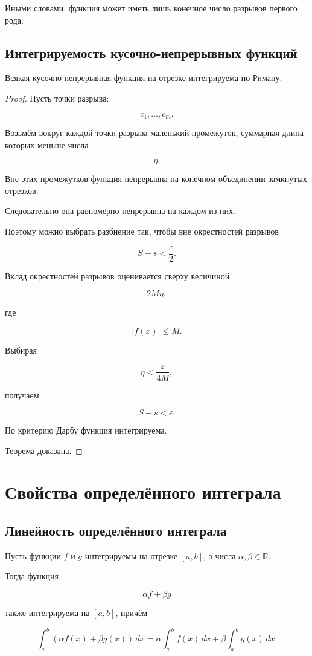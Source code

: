 \documentclass[14pt]{extreport}
\begin{document}
Иными словами, функция может иметь лишь конечное число разрывов первого рода.

\section{Интегрируемость кусочно-непрерывных функций}

\begin{theorem}
Всякая кусочно-непрерывная функция на отрезке
интегрируема по Риману.
\end{theorem}

\begin{proof}

Пусть точки разрыва:

\[
c_1,\ldots,c_m.
\]

Возьмём вокруг каждой точки разрыва маленький промежуток,
суммарная длина которых меньше числа

\[
\eta.
\]

Вне этих промежутков функция непрерывна на конечном объединении
замкнутых отрезков.

Следовательно она равномерно непрерывна на каждом из них.

Поэтому можно выбрать разбиение так, чтобы вне окрестностей разрывов

\[
S-s<\frac{\varepsilon}{2}.
\]

Вклад окрестностей разрывов оценивается сверху величиной

\[
2M\eta,
\]

где

\[
|f(x)|\le M.
\]

Выбирая

\[
\eta
<
\frac{\varepsilon}{4M},
\]

получаем

\[
S-s<\varepsilon.
\]

По критерию Дарбу функция интегрируема.

Теорема доказана.
\end{proof}

\chapter{Свойства определённого интеграла}

\section{Линейность определённого интеграла}

\begin{theorem}
Пусть функции $f$ и $g$ интегрируемы на отрезке $[a,b]$,
а числа $\alpha,\beta\in\mathbb R$.

Тогда функция

\[
\alpha f+\beta g
\]

также интегрируема на $[a,b]$, причём

\[
\boxed{
\int_a^b (\alpha f(x)+\beta g(x))\,dx
=
\alpha\int_a^b f(x)\,dx
+
\beta\int_a^b g(x)\,dx.
}
\]
\end{theorem}
\end{document}
